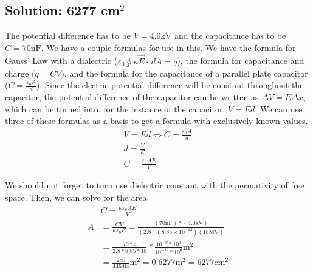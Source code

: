 \documentclass[12pt]{article}
\begin{document}
\subsection*{Solution: 6277 cm$^2$}
The potential difference has to be $V = 4.0 \unit{\kilo\volt}$ and the capacitance has to be $C = 70 \unit{\nano\farad}$. 
We have a couple formulas for use in this. 
We have the formula for Gauss' Law with a dialectric ($\varepsilon_0 \oint\kappa\vec{E}\cdot\,dA = q$), the formula for capacitance and charge ($q = CV$), and the formula for the capacitance of a parallel plate capacitor ($C = \frac{\varepsilon_0 A}{d}$). 
Since the electric potential difference will be constant throughout the capacitor, the potential difference of the capacitor can be written as $\Delta V = E \Delta x$, which can be turned into, for the instance of the capacitor, $V = Ed$.
We can use three of these formulas as a basis to get a formula with exclusively known values.
\begin{gather*}
    V = Ed \Leftrightarrow C = \frac{\varepsilon_0 A}{d}\\
    d   =   \frac{V}{E}\\
    C   =   \frac{\varepsilon_0 A E}{V}
\end{gather*}

We should not forget to turn use dielectric constant with the permativity of free space.
Then, we can solve for the area.
\begin{align*}
    &C  =   \frac{\kappa\varepsilon_0 AE}{V}\\
    A   &=  \frac{CV}{\kappa\varepsilon_0 E}
        =   \frac{(70 \unit{\nano\farad})*(4.0 \unit{\kilo\volt})}{(2.8)(8.85 \times 10^{-12})(18 \unit{\mega\volt})}\\
        &=  \frac{70*4}{2.8*8.85*18} * \frac{10^{-9}*10^3}{10^{-12}*10^6}\unit{\meter^2}\\
        &=  \frac{280}{446.04} \unit{\meter^2}
        =   0.6277 \unit{\meter^2}
        =   \boxed{6277\unit{\centi\meter^2}}
\end{align*}
\end{document}
